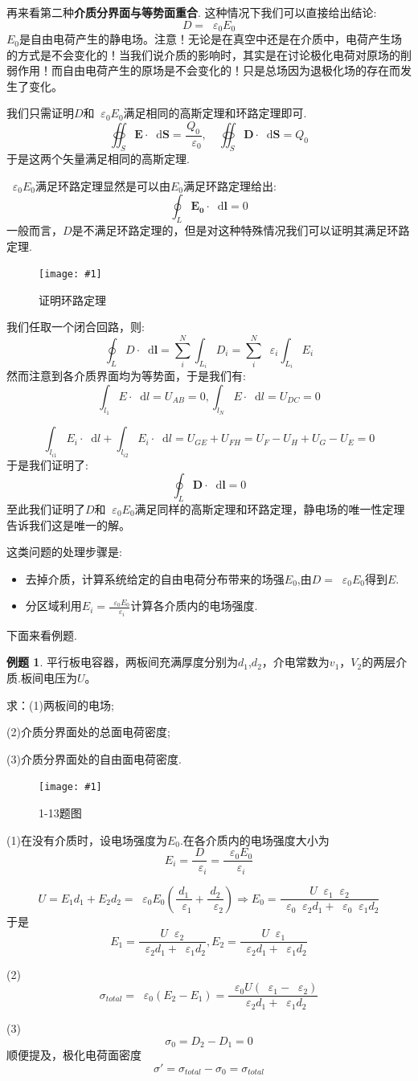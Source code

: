 \documentclass[12pt,a4paper,oneside]{report}
\theoremstyle{definition}
\newtheorem{example}{例题}[chapter]
\theoremstyle{remark}
\newcommand{\insertfig}[3]{
    \begin{figure}[ht]
        \centering
        \texttt{[image: \#1]}
        \caption{#2}
        \label{fig:#1}
    \end{figure}
}
\renewcommand{\d}{\mathop{}\!\mathrm{d}}
\renewcommand{\v}{\mathop{}\!\varepsilon}
\begin{document}
再来看第二种\textbf{介质分界面与等势面重合}. 这种情况下我们可以直接给出结论:
\[
D = \v_0 E_0
\]
$E_0$是自由电荷产生的静电场。注意！无论是在真空中还是在介质中，电荷产生场的方式是不会变化的！当我们说介质的影响时，其实是在讨论极化电荷对原场的削弱作用！而自由电荷产生的原场是不会变化的！只是总场因为退极化场的存在而发生了变化。

我们只需证明$D$和$\v_0 E_0$满足相同的高斯定理和环路定理即可.
\[
\oiint_S \mathbf{E} \cdot \d \mathbf{S}  = \frac{Q_0}{\v_0},\quad
\oiint_S \mathbf{D} \cdot \d \mathbf{S}  = Q_0
\]
于是这两个矢量满足相同的高斯定理.

$\v_0 E_0$满足环路定理显然是可以由$E_0$满足环路定理给出:
\[
\oint_L \mathbf{E_0} \cdot \d \mathbf{l}  = 0 
\]
一般而言，$D$是不满足环路定理的，但是对这种特殊情况我们可以证明其满足环路定理.
  \insertfig{1-4.png}{证明环路定理}{0.25}

我们任取一个闭合回路，则:
\[
\oint_L D \cdot \d \mathbf{l} = \sum_i^N \int_{L_i} D_i = \sum_i^N \v_i \int_{L_i} E_i
\]
然而注意到各介质界面均为等势面，于是我们有:
\[
\int_{l_1} E \cdot \d l =U_{AB} =0, \int_{l_N} E \cdot \d l =U_{DC} =0 
\]

\[
\int_{l_{i1}} E_i \cdot \d l + \int_{l_{i2}} E_i \cdot \d l = U_{GE}+U_{FH}=U_F - U_H+U_G-U_E = 0
\]
于是我们证明了:
\[
\oint_L \mathbf{D} \cdot \d \mathbf{l}  = 0
\]
至此我们证明了$D$和$\v_0 E_0$满足同样的高斯定理和环路定理，静电场的唯一性定理告诉我们这是唯一的解。

这类问题的处理步骤是:
\begin{itemize}
  \item 去掉介质，计算系统给定的自由电荷分布带来的场强$E_0$,由$D=\v_0 E_0$得到$E$.
  \item 分区域利用$E_i=\frac{\v_0 E_0}{\v_i}$计算各介质内的电场强度.
\end{itemize}

下面来看例题.
\begin{example}
  平行板电容器，两板间充满厚度分别为$d_1$,$d_2$，介电常数为$v_1$，$V_2$的两层介质.板间电压为$U$。
  
  求：(1)两板间的电场;
  
  (2)介质分界面处的总面电荷密度;
  
  (3)介质分界面处的自由面电荷密度.
  \insertfig{1-5.png}{1-13题图}{0.25}

(1)在没有介质时，设电场强度为$E_0$.在各介质内的电场强度大小为
\[
E_i = \frac{D}{\v_i}=\frac{\v_0 E_0}{\v_i}
\]

\[
U=E_1d_1+E_2d_2=\v_0E_0(\frac{d_1}{\v_1}+\frac{d_2}{\v_2})
\Rightarrow E_0 = \frac{U\v_1\v_2}{\v_0\v_2d_1+\v_0\v_1d_2}
\]
于是
\[
E_1=\frac{U\v_2}{\v_2d_1+\v_1d_2},E_2 = \frac{U\v_1}{\v_2d_1+\v_1d_2}
\]

(2)\[
\sigma_{total} = \v_0(E_2-E_1) =\frac{\v_0U(\v_1-\v_2)}{\v_2d_1+\v_1d_2}  
\]

(3)\[
\sigma_0 = D_2-D_1 = 0
\]
顺便提及，极化电荷面密度\[
\sigma' = \sigma_{total} -\sigma_0 = \sigma_{total}
\]
\end{example}
\newpage
\end{document}
